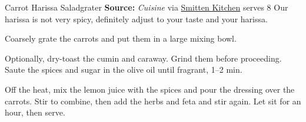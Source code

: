 \begin{recipe}{Carrot Harissa Salad}{grater \hfill} %
 {\textbf{Source:} \textit{Cuisine} via \href{https://smittenkitchen.com/2010/05/carrot-salad-with-harissa-feta-and-mint/}{Smitten Kitchen} \hfill serves 8}
 \freeform Our harissa is not very spicy, definitely adjust to your taste and your harissa.

 Coarsely grate the carrots and put them in a large mixing bowl.

 Optionally, dry-toast the cumin and caraway. Grind them before proceeding. Saute the spices and sugar in the olive oil until fragrant, 1--2 min.

 Off the heat, mix the lemon juice with the spices and pour the dressing over the carrots. Stir to combine, then add the herbs and feta and stir again. Let sit for an hour, then serve.
\end{recipe}
